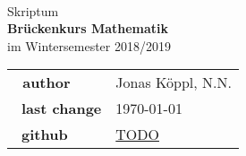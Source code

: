 \documentclass{report}
\theoremstyle{changebreak} %
\numberwithin{theorem}{chapter}
\numberwithin{theorem}{chapter}
\numberwithin{theorem}{chapter}
\numberwithin{theorem}{chapter}
\numberwithin{theorem}{chapter}
\numberwithin{theorem}{chapter}
\begin{document}
\begin{titlepage}
    \ \newline\newline\newline\newline\newline

	\begin{center}

		\huge Skriptum \\
		\Huge\textbf{Brückenkurs Mathematik}\\
		\huge im Wintersemester 2018/2019\\ 
		\normalsize

		\vspace{1cm}
		\begin{tabular}[b]{l|l}
			\textbf{\ author}      & Jonas Köppl, N.N. \\\
            \textbf{last change}   & \today \\\
            \textbf{github}        & \url{TODO}
		\end{tabular}
		\vspace{1cm}

	\end{center}

\end{titlepage}

\tableofcontents 







\end{document}
